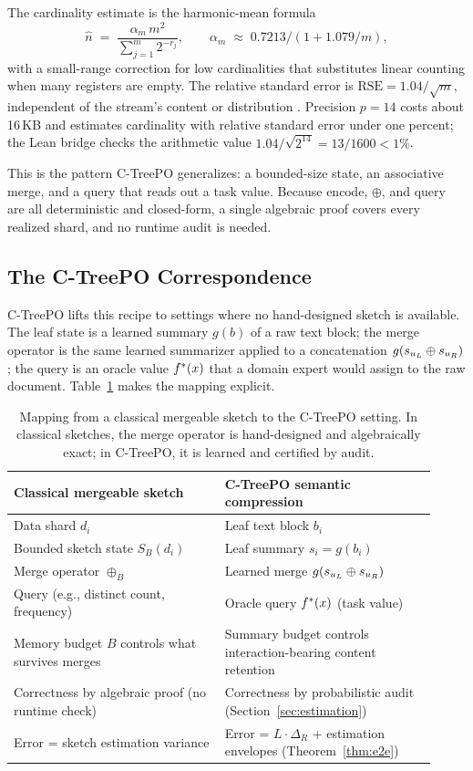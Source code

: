 The cardinality estimate is the harmonic-mean formula
\[
\hat n \;=\; \frac{\alpha_m \, m^2}{\sum_{j=1}^m 2^{-r_j}},
\qquad
\alpha_m \;\approx\; 0.7213 / (1 + 1.079/m),
\]
with a small-range correction for low cardinalities that substitutes
linear counting when many registers are empty. The relative standard error
is $\mathrm{RSE} = 1.04/\sqrt{m}$, independent of the stream's content
or distribution \citep{FlajoletEtAl2007}. Precision $p=14$ costs about
16\,KB and estimates cardinality with relative standard error under one
percent; the Lean bridge checks the arithmetic value
$1.04/\sqrt{2^{14}}=13/1600<1\%$.

This is the pattern C-TreePO generalizes: a bounded-size
state, an associative merge, and a query that reads out a task value.
Because $\mathrm{encode}$, $\oplus$, and $\mathrm{query}$ are all
deterministic and closed-form, a single algebraic proof covers every
realized shard, and no runtime audit is needed.

\subsection{The C-TreePO Correspondence}

C-TreePO lifts this recipe to settings where no hand-designed sketch is
available. The leaf state is a learned summary $g(b)$ of a raw text block;
the merge operator is the same learned summarizer applied to a
concatenation $g(s_{u_L} \oplus s_{u_R})$; the query is an oracle value
$f^\ast(x)$ that a domain expert would assign to the raw document.
Table~\ref{tab:sketch-mapping} makes the mapping explicit.

\begin{table}[htbp]
    \centering
    \small
    \begin{tabular}{p{0.46\linewidth}p{0.46\linewidth}}
        \toprule
        Classical mergeable sketch & C-TreePO semantic compression \\
        \midrule
        Data shard $d_i$ & Leaf text block $b_i$ \\
        Bounded sketch state $S_B(d_i)$ & Leaf summary $s_i = g(b_i)$ \\
        Merge operator $\oplus_B$ & Learned merge $g(s_{u_L}\oplus s_{u_R})$ \\
        Query (e.g., distinct count, frequency) & Oracle query $f^\ast(x)$ (task value) \\
        Memory budget $B$ controls what survives merges & Summary budget controls interaction-bearing content retention \\
        Correctness by algebraic proof (no runtime check) & Correctness by probabilistic audit (Section~\ref{sec:estimation}) \\
        Error = sketch estimation variance & Error = $L \cdot \Delta_R$ + estimation envelopes (Theorem~\ref{thm:e2e}) \\
        \bottomrule
    \end{tabular}
    \caption{Mapping from a classical mergeable sketch to the C-TreePO setting. In classical sketches, the merge operator is hand-designed and algebraically exact; in C-TreePO, it is learned and certified by audit.}
    \label{tab:sketch-mapping}
\end{table}

